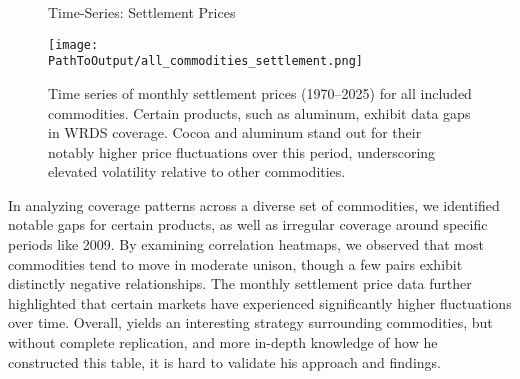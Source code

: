 \documentclass[12pt]{article}
\begin{document}
\clearpage
\begin{figure}[ht!]
  \centering
  \caption{Time-Series: Settlement Prices}
  \begin{adjustbox}{max width=\textwidth}
  \texttt{[image: \\PathToOutput/all\_commodities\_settlement.png]}
  \end{adjustbox}
  \caption*{Time series of monthly settlement prices (1970–2025) for all included commodities. 
  Certain products, such as aluminum, exhibit data gaps in WRDS coverage. Cocoa and aluminum 
  stand out for their notably higher price fluctuations over this period, underscoring elevated 
  volatility relative to other commodities.}
  \label{fig:all_commodities_settlement}
\end{figure}  

\FloatBarrier

In analyzing coverage patterns across a diverse set of commodities, we identified notable gaps 
for certain products, as well as irregular coverage around specific periods like 2009. By examining 
correlation heatmaps, we observed that most commodities tend to move in moderate unison, though a few pairs 
exhibit distinctly negative relationships. The monthly settlement price data further highlighted that certain 
markets have experienced significantly higher fluctuations over time. Overall, \cite{Yang2013} yields an interesting 
strategy surrounding commodities, but without complete replication, and more in-depth knowledge of how he constructed
this table, it is hard to validate his approach and findings. 


\clearpage




\end{document}

